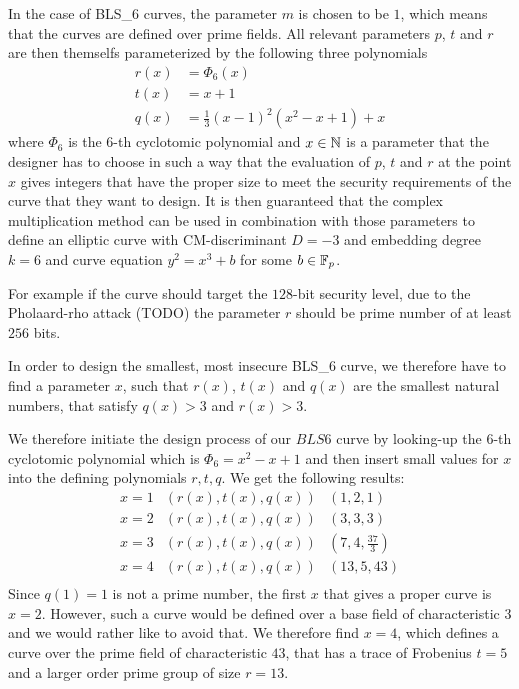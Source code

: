 In the case of BLS\_6 curves, the parameter $m$ is chosen to be $1$, which means that the curves are defined over prime fields. All relevant parameters $p$, $t$ and $r$ are then themselfs parameterized by the following three polynomials
\begin{align*}
r(x) &= \Phi_6(x)\\
t(x) &= x+1\\
q(x) &= \frac{1}{3}(x-1)^2(x^{2}-x+1) +x
\end{align*}
where $\Phi_6$ is the $6$-th cyclotomic polynomial and  $x\in\mathbb{N}$ is a parameter that the designer has to choose in such a way that the evaluation of $p$, $t$ and $r$ at the point $x$ gives integers that have the proper size to meet the security requirements of the curve that they want to design. It is then guaranteed that the complex multiplication method can be used in combination with those parameters to define an elliptic curve with CM-discriminant $D=-3$ and embedding degree $k=6$ and curve equation $y^2 = x^3 +b$ for some $b\in\mathbb{F}_p$. 

For example if the curve should target the $128$-bit security level, due to the Pholaard-rho attack (TODO) the parameter $r$ should be prime number of at least $256$ bits.

In order to design the smallest, most insecure BLS\_6 curve, we therefore have to find a parameter $x$, such that $r(x)$, $t(x)$ and $q(x)$ are the smallest natural numbers, that satisfy $q(x)>3$ and $r(x)>3$.  

We therefore initiate the design process of our $BLS6$ curve by looking-up the $6$-th cyclotomic polynomial which is $\Phi_{6}=x^2-x+1$ and then insert small values for $x$ into the defining polynomials $r,t,q$. We get the following results:
$$
\begin{array}{lcr}
x=1 & (r(x),t(x),q(x)) & (1,2,1)\\
x=2 & (r(x),t(x),q(x)) & (3,3,3)\\
x=3 & (r(x),t(x),q(x)) & (7,4,\frac{37}{3})\\
x=4 & (r(x),t(x),q(x)) & (13,5,43)\\
\end{array}
$$
Since $q(1)=1$ is not a prime number, the first $x$ that gives a proper curve is $x=2$. However, such a curve would be defined over a base field of characteristic $3$ and we would rather like to avoid that. We therefore find $x=4$, which defines a curve over the prime field of characteristic $43$, that has a trace of Frobenius $t=5$ and a larger order prime group of size $r=13$. 


